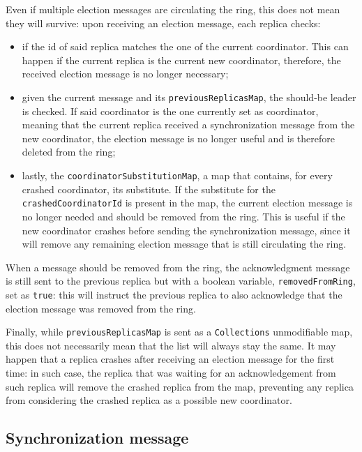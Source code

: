 Even if multiple election messages are circulating the ring, this does not mean they will survive: upon receiving an election message, each replica checks:

\begin{itemize}
\item if the id of said replica matches the one of the current coordinator. This can happen if the current replica is the current new coordinator, therefore, the received election message is no longer necessary;

\item given the current message and its \texttt{previousReplicasMap}, the should-be leader is checked. If said coordinator is the one currently set as coordinator, meaning that the current replica received a synchronization message from the new coordinator, the election message is no longer useful and is therefore deleted from the ring;

\item lastly, the \texttt{coordinatorSubstitutionMap}, a map that contains, for every crashed coordinator, its substitute. If the substitute for the \texttt{crashedCoordinatorId} is present in the map, the current election message is no longer needed and should be removed from the ring. This is useful if the new coordinator crashes before sending the synchronization message, since it will remove any remaining election message that is still circulating the ring.
\end{itemize}

When a message should be removed from the ring, the acknowledgment message is still sent to the previous replica but with a boolean variable, \texttt{removedFromRing}, set as \texttt{true}: this will instruct the previous replica to also acknowledge that the election message was removed from the ring.

Finally, while \texttt{previousReplicasMap} is sent as a \texttt{Collections} unmodifiable map, this does not necessarily mean that the list will always stay the same. It may happen that a replica crashes after receiving an election message for the first time: in such case, the replica that was waiting for an acknowledgement from such replica will remove the crashed replica from the map, preventing any replica from considering the crashed replica as a possible new coordinator.

\subsection{Synchronization message}

